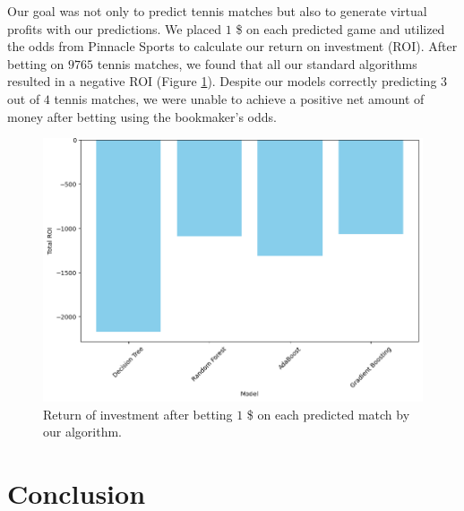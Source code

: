 \documentclass[preprint,aps,nofootinbib,a4paper,superscriptaddress,longbibliography,amsfonts,amssymb,amsmath,titlepage]{revtex4-2}
\begin{document}
Our goal was not only to predict tennis matches but also to generate virtual profits with our predictions. We placed $1$ \$ on each predicted game and utilized the odds from Pinnacle Sports to calculate our return on investment (ROI). After betting on $9765$ tennis matches, we found that all our standard algorithms resulted in a negative ROI (Figure \ref{betting-strategy}). Despite our models correctly predicting $3$ out of $4$ tennis matches, we were unable to achieve a positive net amount of money after betting using the bookmaker's odds.
%
\begin{figure}[h]
\includegraphics[width=\textwidth]{pictures/betting.png}
\caption{Return of investment after betting $1$ \$ on each predicted match by our algorithm.}
\label{betting-strategy}
\end{figure}
%

%
%
%
%


\section{Conclusion}
\end{document}

